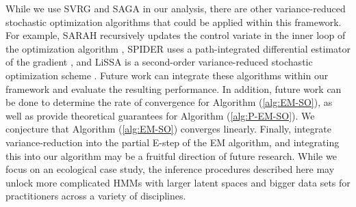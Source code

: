 
%
%

While we use SVRG and SAGA in our analysis, there are other variance-reduced stochastic optimization algorithms that could be applied within this framework. For example, SARAH recursively updates the control variate in the inner loop of the optimization algorithm \citep{Nguyen:2017}, SPIDER uses a path-integrated differential estimator of the gradient \citep{Fang:2018}, and LiSSA is a second-order variance-reduced stochastic optimization scheme \citep{Agarwal:2017}. Future work can integrate these algorithms within our framework and evaluate the resulting performance. In addition, future work can be done to determine the rate of convergence for Algorithm (\ref{alg:EM-SO}), as well as provide theoretical guarantees for Algorithm (\ref{alg:P-EM-SO}). We conjecture that Algorithm (\ref{alg:EM-SO}) converges linearly. Finally, \citet{Chen:2018} integrate variance-reduction into the partial E-step of the EM algorithm, and integrating this into our algorithm may be a fruitful direction of future research. While we focus on an ecological case study, the inference procedures described here may unlock more complicated HMMs with larger latent spaces and bigger data sets for practitioners across a variety of disciplines.


